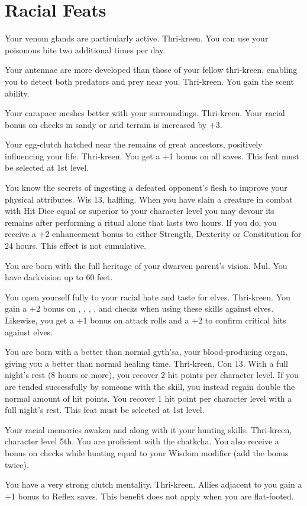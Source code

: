 \section{Racial Feats}

{Your venom glands are particularly active.}
{Thri‐kreen.}
{You can use your poisonous bite two additional times per day.}
{}{}

{Your antennae are more developed than those of your fellow thri‐kreen, enabling you to detect both predators and prey near you.}
{Thri‐kreen.}
{You gain the scent ability.}
{}{}

{Your carapace meshes better with your surroundings.}
{Thri‐kreen.}
{Your racial bonus on  checks in sandy or arid terrain is increased by +3.}
{}{}

{Your egg‐clutch hatched near the remains of great ancestors, positively influencing your life.}
{Thri‐kreen.}
{You get a +1 bonus on all saves.}
{}
{This feat must be selected at 1st level.}

{You know the secrets of ingesting a defeated opponent's flesh to improve your physical attributes.}
{Wis 13, halfling.}
{When you have slain a creature in combat with Hit Dice equal or superior to your character level you may devour its remains after performing a ritual alone that lasts two hours. If you do, you receive a +2 enhancement bonus to either Strength, Dexterity or Constitution for 24 hours. This effect is not cumulative.}
{}{}

{You are born with the full heritage of your dwarven parent's vision.}
{Mul.}
{You have darkvision up to 60 feet.}
{}{}

{You open yourself fully to your racial hate and taste for elves.}
{Thri‐kreen.}
{You gain a +2 bonus on , , , , and  checks when using these skills against elves. Likewise, you get a +1 bonus on attack rolls and a +2 to confirm critical hits against elves.}
{}{}

{You are born with a better than normal gyth'sa, your blood‐producing organ, giving you a better than normal healing time.}
{Thri‐kreen, Con 13.}
{With a full night's rest (8 hours or more), you recover 2 hit points per character level. If you are tended successfully by someone with the  skill, you instead regain double the normal amount of hit points.}
{You recover 1 hit point per character level with a full night's rest.}
{This feat must be selected at 1st level.}

{Your racial memories awaken and along with it your hunting skills.}
{Thri‐kreen, character level 5th.}
{You are proficient with the chatkcha. You also receive a bonus on  checks while hunting equal to your Wisdom modifier (add the bonus twice).}
{}{}

{You have a very strong clutch mentality.}
{Thri‐kreen.}
{Allies adjacent to you gain a +1 bonus to Reflex saves. This benefit does not apply when you are flat‐footed.}
{}{}